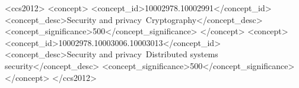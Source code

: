 \documentclass[sigconf,review,anonymous,screen]{acmart}
\begin{document}



\begin{CCSXML}
<ccs2012>
   <concept>
       <concept_id>10002978.10002991</concept_id>
       <concept_desc>Security and privacy~Cryptography</concept_desc>
       <concept_significance>500</concept_significance>
   </concept>
   <concept>
       <concept_id>10002978.10003006.10003013</concept_id>
       <concept_desc>Security and privacy~Distributed systems security</concept_desc>
       <concept_significance>500</concept_significance>
   </concept>
 </ccs2012>
\end{CCSXML}



\end{document}
